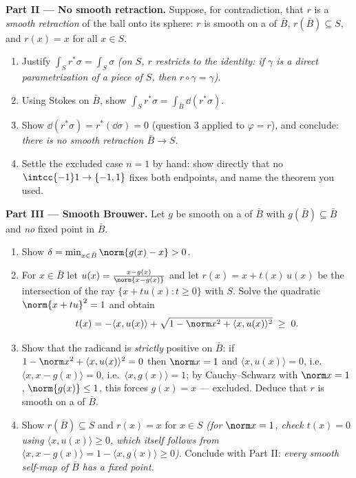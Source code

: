 \begin{problem}
\medskip
\noindent\textbf{Part II --- No smooth retraction.} Suppose,
for contradiction, that $r$ is a \emph{smooth retraction} of
the ball onto its sphere: $r$ is smooth on a  of
$\bar B$, $r(\bar B) \subseteq S$, and $r(x) = x$ for all
$x \in S$.
\begin{enumerate}[resume]
  \item Justify $\int_Sr^*\sigma = \int_S\sigma$
        \emph{(on $S$, $r$ restricts to the identity: if
        $\gamma$ is a direct parametrization of a piece of
        $S$, then $r\circ\gamma = \gamma$)}.
  \item Using Stokes on $\bar B$, show $\int_Sr^*\sigma =
        \int_{\bar B}\dd(r^*\sigma)$.
  \item Show $\dd(r^*\sigma) = r^*(\dd\sigma) = 0$ (question
        3 applied to $\varphi = r$), and conclude:
        \emph{there is no smooth retraction $\bar B \to S$.}
  \item Settle the excluded case $n = 1$ by hand: show
        directly that no  $\intcc{-1}1 \to
        \{-1, 1\}$ fixes both endpoints, and name the
        theorem you used.
\end{enumerate}

\medskip
\noindent\textbf{Part III --- Smooth Brouwer.} Let $g$ be
smooth on a  of $\bar B$ with $g(\bar B)
\subseteq \bar B$ and \emph{no} fixed point in $\bar B$.
\begin{enumerate}[resume]
  \item Show $\delta = \min_{x\in\bar B}\norm{g(x) - x} >
        0$.
  \item For $x \in \bar B$ let $u(x) = \frac{x -
        g(x)}{\norm{x - g(x)}}$ and let $r(x) = x +
        t(x)\,u(x)$ be the intersection of the ray
        $\{x + tu(x) : t \geq 0\}$ with $S$. Solve the
        quadratic $\norm{x + tu}^2 = 1$ and obtain
        \[
        t(x) = -\langle x, u(x)\rangle +
        \sqrt{1 - \norm x^2 + \langle x, u(x)\rangle^2}
        \;\geq\; 0 .
        \]
  \item Show that the radicand is \emph{strictly} positive
        on $\bar B$: if $1 - \norm x^2 + \langle x,
        u(x)\rangle^2 = 0$ then $\norm x = 1$ and $\langle
        x, u(x)\rangle = 0$, i.e.\ $\langle x, x -
        g(x)\rangle = 0$, i.e.\ $\langle x, g(x)\rangle =
        1$; by Cauchy--Schwarz with $\norm x = 1$,
        $\norm{g(x)} \leq 1$, this forces $g(x) = x$ ---
        excluded. Deduce that $r$ is smooth on a
         of $\bar B$.
  \item Show $r(\bar B) \subseteq S$ and $r(x) = x$ for $x
        \in S$ \emph{(for $\norm x = 1$, check $t(x) = 0$
        using $\langle x, u(x)\rangle \geq 0$, which itself
        follows from $\langle x, x - g(x)\rangle = 1 -
        \langle x, g(x)\rangle \geq 0$)}. Conclude with
        Part II: \emph{every smooth self-map of $\bar B$ has
        a fixed point.}
\end{enumerate}


\end{problem}

